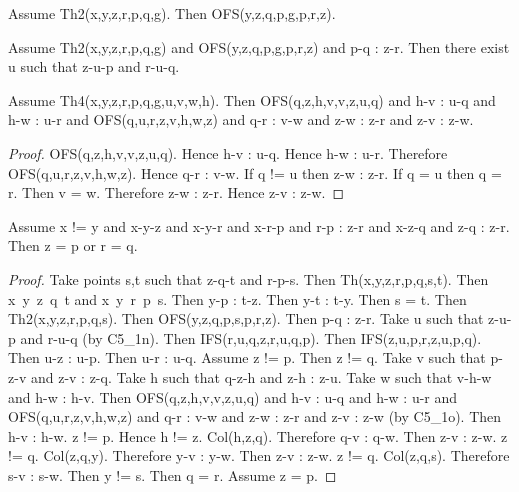 \documentclass{article}
\begin{document}
\begin{forthel}
    \begin{lemma}[C5_1m]
      Assume Th2(x,y,z,r,p,q,g). Then OFS(y,z,q,p,g,p,r,z).
    \end{lemma}

    \begin{lemma}[C5_1n]
      Assume Th2(x,y,z,r,p,q,g) and OFS(y,z,q,p,g,p,r,z) and p-q : z-r. Then
      there exist u such that z-u-p and r-u-q.
    \end{lemma}

    \begin{lemma}[C5_1o]
      Assume Th4(x,y,z,r,p,q,g,u,v,w,h). Then OFS(q,z,h,v,v,z,u,q) and h-v : u-q
      and h-w : u-r and OFS(q,u,r,z,v,h,w,z) and q-r : v-w and z-w : z-r and
      z-v : z-w.
    \end{lemma}
    \begin{proof}
    	OFS(q,z,h,v,v,z,u,q). Hence h-v : u-q. Hence h-w : u-r. %
    	Therefore OFS(q,u,r,z,v,h,w,z). Hence q-r : v-w.
    	If q != u then z-w : z-r. If q = u then q = r. %
    	Then v = w. Therefore z-w : z-r.
    	Hence z-v : z-w.
    \end{proof}


    \begin{lemma}[C5_1p]
      Assume x != y and x-y-z and x-y-r and x-r-p and r-p : z-r and x-z-q and
      z-q : z-r. Then z = p or r = q.
    \end{lemma}
    \begin{proof}
    	Take points s,t such that z-q-t and r-p-s.
    	Then Th(x,y,z,r,p,q,s,t).
    	Then x~y~z~q~t and x~y~r~p~s.
    	Then y-p : t-z.
    	Then y-t : t-y.
    	Then s = t.
    	Then Th2(x,y,z,r,p,q,s).
    	Then OFS(y,z,q,p,s,p,r,z).
    	Then p-q : z-r.
    	Take u such that z-u-p and r-u-q (by C5_1n).
    	Then IFS(r,u,q,z,r,u,q,p).
    	Then IFS(z,u,p,r,z,u,p,q).
    	Then u-z : u-p.
    	Then u-r : u-q.
    	Assume z != p. Then z != q.
    		Take v such that p-z-v and z-v : z-q.
    		Take h such that q-z-h and z-h : z-u.
    		Take w such that v-h-w and h-w : h-v.
    		Then OFS(q,z,h,v,v,z,u,q) and h-v : u-q and h-w : u-r and
    			OFS(q,u,r,z,v,h,w,z) and q-r : v-w and z-w : z-r and z-v : z-w (by C5_1o).
    		Then h-v : h-w. z != p. Hence h != z. Col(h,z,q). Therefore q-v : q-w.
    		Then z-v : z-w. z != q. Col(z,q,y). Therefore y-v : y-w.
    		Then z-v : z-w. z != q. Col(z,q,s). Therefore s-v : s-w.
    		Then y != s.
    		Then q = r.
    	Assume z = p.
    \end{proof}


\end{forthel}
\end{document}
